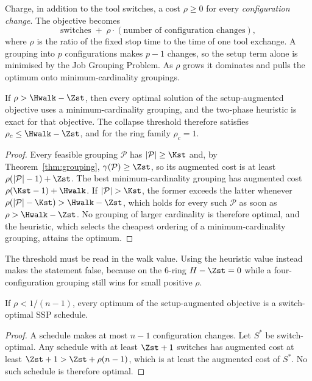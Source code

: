Charge, in addition to the tool switches, a cost $\rho\ge0$ for every
\emph{configuration change}. The objective becomes
\[
  \text{switches}\;+\;\rho\cdot(\text{number of configuration changes}),
\]
where $\rho$ is the ratio of the fixed stop time to the time of one tool exchange. A
grouping into $p$ configurations makes $p-1$ changes, so the setup term alone is
minimised by the Job Grouping Problem. As $\rho$ grows it dominates and pulls the
optimum onto minimum-cardinality groupings.

\begin{theorem}\label{thm:collapse}
If $\rho>\Hwalk-\Zst$, then every optimal solution of the setup-augmented objective
uses a minimum-cardinality grouping, and the two-phase heuristic is exact for that
objective. The collapse threshold therefore satisfies $\rho_c\le\Hwalk-\Zst$, and for
the ring family $\rho_c=1$.
\end{theorem}

\begin{proof}
Every feasible grouping $\mathcal{P}$ has $\lvert\mathcal{P}\rvert\ge\Kst$ and, by
Theorem~\ref{thm:grouping}, $\gamma(\mathcal{P})\ge\Zst$, so its augmented cost is at
least $\rho(\lvert\mathcal{P}\rvert-1)+\Zst$. The best minimum-cardinality grouping
has augmented cost $\rho(\Kst-1)+\Hwalk$. If $\lvert\mathcal{P}\rvert>\Kst$, the
former exceeds the latter whenever
$\rho(\lvert\mathcal{P}\rvert-\Kst)>\Hwalk-\Zst$, which holds for every such
$\mathcal{P}$ as soon as $\rho>\Hwalk-\Zst$. No grouping of larger cardinality is
therefore optimal, and the heuristic, which selects the cheapest ordering of a
minimum-cardinality grouping, attains the optimum.
\end{proof}

The threshold must be read in the walk value. Using the heuristic value instead makes
the statement false, because on the $6$-ring $H-\Zst=0$ while a four-configuration
grouping still wins for small positive $\rho$.

\begin{lemma}\label{lem:lowrho}
If $\rho<1/(n-1)$, every optimum of the setup-augmented objective is a
switch-optimal SSP schedule.
\end{lemma}

\begin{proof}
A schedule makes at most $n-1$ configuration changes. Let $S^{*}$ be switch-optimal.
Any schedule with at least $\Zst+1$ switches has augmented cost at least
$\Zst+1>\Zst+\rho(n-1)$, which is at least the augmented cost of $S^{*}$. No such
schedule is therefore optimal.
\end{proof}

